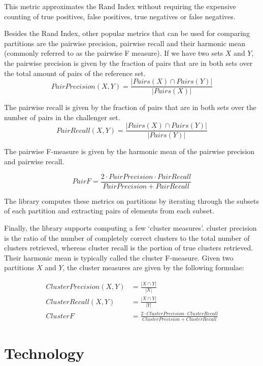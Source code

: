 \documentclass[11pt]{article}
\begin{document}
    This metric approximates the Rand Index without requiring the expensive
    counting of true positives, false positives, true negatives or false
    negatives.
    
    Besides the Rand Index, other popular metrics that can be used for comparing
    partitions are the pairwise precision, pairwise recall and their harmonic
    mean (commonly referred to as the pairwise F measure).
    If we have two sets $X$ and $Y$, the pairwise precision is given by the
    fraction of pairs that are in both sets over the total amount of pairs of
    the reference set\cite{hitesh2012}.
    \[ Pair Precision(X, Y) = \frac{|{Pairs(X)}\cap{Pairs(Y)}|}{|Pairs(X)|} \]
    
    The pairwise recall is given by the fraction of pairs that are in both sets
    over the number of pairs in the challenger set\cite{hitesh2012}.
    \[ Pair Recall(X, Y) = \frac{|{Pairs(X)}\cap{Pairs(Y)}|}{|Pairs(Y)|} \]

    The pairwise F-measure is given by the harmonic mean of the pairwise
    precision and pairwise recall.

    \[ Pair F = \frac{2 \cdot Pair Precision \cdot Pair Recall}{Pair Precision + Pair Recall} \]

    The library computes these metrics on partitions by iterating through the
    subsets of each partition and extracting pairs of elements from each subset.
    
    Finally, the library supports computing a few `cluster measures'\cite{hitesh2012}.
    cluster precision is the ratio of the number of completely correct
    clusters to the total number of clusters retrieved, whereas cluster recall
    is the portion of true clusters retrieved\cite{huang2006efficient}.
    Their harmonic mean is typically called the cluster F-measure.
    Given two partitions $X$ and $Y$, the cluster measures are given by the
    following formulae:

    \begin{align*}
        Cluster Precision(X, Y) &= \frac{|{X}\cap{Y}|}{|X|}\\
        Cluster Recall(X, Y) &= \frac{|{X}\cap{Y}|}{|Y|}\\
        Cluster F &= \frac{2\cdot{Cluster Precision}\cdot{Cluster Recall}}{Cluster Precision + Cluster Recall}
    \end{align*}

    \section{Technology}\label{sec:tech}
\end{document}
